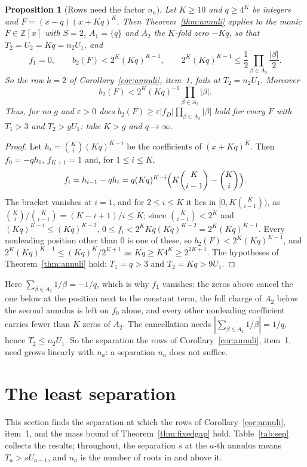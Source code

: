 \documentclass[11pt]{article}
\newtheorem{proposition}[theorem]{Proposition}
\begin{document}
\begin{proposition}[Rows need the factor $n_a$]\label{prop:rowsneedn}
Let $K\ge10$ and $q\ge4^K$ be integers and $F=(x-q)(x+Kq)^K$.  Then
Theorem~\ref{thm:annuli} applies to the monic $F\in\mathbb Z[x]$ with
$S=2$, $A_1=\{q\}$ and $A_2$ the $K$-fold zero $-Kq$, so that
$T_2=U_2=Kq=n_2U_1$, and
\[
  f_1=0,\qquad b_2(F)<2^K(Kq)^{K-1},\qquad
  2^K(Kq)^{K-1}\le\frac12\prod_{\beta\in A_2}\frac{|\beta|}2 .
\]
So the row $k=2$ of Corollary~\ref{cor:annuli}, item~1, fails at $T_2=n_2U_1$.
Moreover
\[
  b_2(F)<2^K(Kq)^{-1}\prod_{\beta\in A_2}|\beta|.
\]
Thus, for no $g$ and $\varepsilon>0$ does
$b_2(F)\ge\varepsilon|f_D|\prod_{\beta\in A_2}|\beta|$ hold for every $F$
with $T_1>3$ and $T_2>gU_1$: take $K>g$ and $q\to\infty$.
\end{proposition}

\begin{proof}
Let $h_i=\binom Ki(Kq)^{K-i}$ be the coefficients of $(x+Kq)^K$.  Then
$f_0=-qh_0$, $f_{K+1}=1$ and, for $1\le i\le K$,
\[
  f_i=h_{i-1}-qh_i=q(Kq)^{K-i}\Bigl(K\binom K{i-1}-\binom Ki\Bigr).
\]
The bracket vanishes at $i=1$, and for $2\le i\le K$ it lies in
$[0,K\binom K{i-1})$, as $\binom Ki/\binom K{i-1}=(K-i+1)/i\le K$; since
$\binom K{i-1}<2^K$ and $(Kq)^{K-i}\le(Kq)^{K-2}$,
$0\le f_i<2^KKq(Kq)^{K-2}=2^K(Kq)^{K-1}$.  Every nonleading position other
than $0$ is one of these, so $b_2(F)<2^K(Kq)^{K-1}$, and
$2^K(Kq)^{K-1}\le(Kq)^K/2^{K+1}$ as $Kq\ge K4^K\ge2^{2K+1}$.  The
hypotheses of Theorem~\ref{thm:annuli} hold: $T_1=q>3$ and $T_2=Kq>9U_1$.
\end{proof}

Here $\sum_{\beta\in A_2}1/\beta=-1/q$, which is why $f_1$ vanishes: the
zeros above cancel the one below at the position next to the constant term,
the full charge of $A_2$ below the second annulus is left on $f_0$ alone,
and every other nonleading coefficient carries fewer than $K$ zeros of
$A_2$.  The cancellation needs $|\sum_{\beta\in A_2}1/\beta|=1/q$, hence
$T_2\le n_2U_1$.  So the separation the rows of Corollary~\ref{cor:annuli},
item~1, need grows linearly with $n_a$: a separation $n_a$ does not
suffice.

\section{The least separation}\label{sec:separation}

This section finds the separation at which the rows of
Corollary~\ref{cor:annuli}, item~1, and the mass bound of
Theorem~\ref{thm:fixedgap} hold.  Table~\ref{tab:sep} collects the results;
throughout, the separation $s$ at the $a$-th annulus means
$T_a>sU_{a-1}$, and $n_a$ is the number of roots in and above it.
\end{document}

